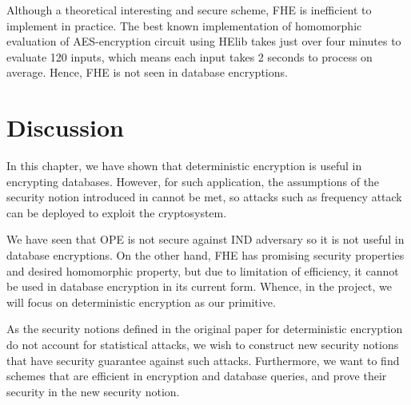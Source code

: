 Although a theoretical interesting and secure scheme, FHE is inefficient to implement in practice. The best known implementation of homomorphic evaluation of AES-encryption circuit using HElib \cite{HElib} takes just over four minutes to evaluate 120 inputs, which means each input takes 2 seconds to process on average. Hence, FHE is not seen in database encryptions.




\section{Discussion}
In this chapter, we have shown that deterministic encryption is useful in encrypting databases. However, for such application, the assumptions of the security notion introduced in \cite{Bellare2007, Boldyreva2008, Bellare2008} cannot be met, so attacks such as frequency attack \cite{Naveed:2015:IAP:2810103.2813651} can be deployed to exploit the cryptosystem.

We have seen that OPE is not secure against IND adversary so it is not useful in database encryptions. On the other hand, FHE has promising security properties and desired homomorphic property, but due to limitation of efficiency, it cannot be used in database encryption in its current form. Whence, in the project, we will focus on deterministic encryption as our primitive.

As the security notions defined in the original paper for deterministic encryption do not account for statistical attacks, we wish to construct new security notions that have security guarantee against such attacks. Furthermore, we want to find schemes that are efficient in encryption and database queries, and prove their security in the new security notion. 